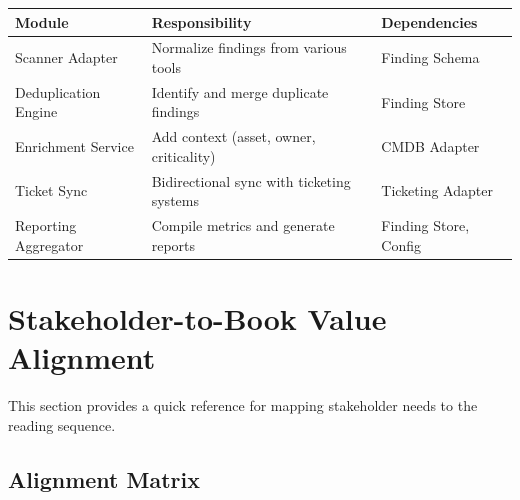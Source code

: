 \documentclass[11pt,letterpaper]{article}
\begin{document}
\begin{center}
\renewcommand{\arraystretch}{1.3}
\footnotesize
\begin{tabular}{p{3.5cm}p{5cm}p{4cm}}
\toprule
\textbf{Module} & \textbf{Responsibility} & \textbf{Dependencies} \\
\midrule
Scanner Adapter & Normalize findings from various tools & Finding Schema \\
Deduplication Engine & Identify and merge duplicate findings & Finding Store \\
Enrichment Service & Add context (asset, owner, criticality) & CMDB Adapter \\
Ticket Sync & Bidirectional sync with ticketing systems & Ticketing Adapter \\
Reporting Aggregator & Compile metrics and generate reports & Finding Store, Config \\
\bottomrule
\end{tabular}
\end{center}

\newpage

\section{Stakeholder-to-Book Value Alignment}

This section provides a quick reference for mapping stakeholder needs to the reading sequence.

\subsection{Alignment Matrix}
\end{document}
